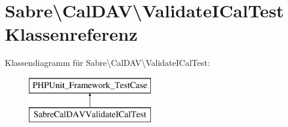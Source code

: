 \hypertarget{class_sabre_1_1_cal_d_a_v_1_1_validate_i_cal_test}{}\section{Sabre\textbackslash{}Cal\+D\+AV\textbackslash{}Validate\+I\+Cal\+Test Klassenreferenz}
\label{class_sabre_1_1_cal_d_a_v_1_1_validate_i_cal_test}
Klassendiagramm für Sabre\textbackslash{}Cal\+D\+AV\textbackslash{}Validate\+I\+Cal\+Test\+:\begin{figure}[H]
\begin{center}
\leavevmode
\includegraphics[height=2.000000cm]{class_sabre_1_1_cal_d_a_v_1_1_validate_i_cal_test}
\end{center}
\end{figure}
